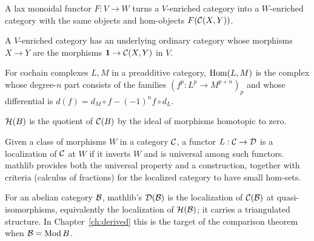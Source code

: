 \begin{theorem}
\label{thm:transport-enrichment}
\mathlibok
\leanok
{}
A lax monoidal functor $F : V \to W$ turns a $V$-enriched category into a $W$-enriched
category with the same objects and hom-objects $F(\mathcal{C}(X,Y))$.
\end{theorem}

\begin{theorem}
\label{thm:forget-enrichment}
\mathlibok
\leanok
{}
A $V$-enriched category has an underlying ordinary category whose morphisms $X \to Y$ are
the morphisms $\mathbf{1} \to \mathcal{C}(X,Y)$ in $V$.
\end{theorem}

\begin{definition}
\label{def:hom-complex}
\mathlibok
\leanok
{}
For cochain complexes $L, M$ in a preadditive category, $\operatorname{Hom}(L,M)$ is the complex whose
degree-$n$ part consists of the families $(f^p : L^p \to M^{p+n})_p$ and whose
differential is $d(f) = d_M \circ f - (-1)^n f \circ d_L$.
\end{definition}

\begin{definition}
\label{def:homotopy-category}
\mathlibok
\leanok
{}
$\mathcal{H}(B)$ is the quotient of $\mathcal{C}(B)$ by the ideal of morphisms homotopic to zero.
\end{definition}

\begin{definition}
\label{def:localization}
\mathlibok
\leanok
Given a class of morphisms $W$ in a category $\mathcal{C}$, a functor $L : \mathcal{C} \to \mathcal{D}$ is a
localization of $\mathcal{C}$ at $W$ if it inverts $W$ and is universal among such functors.
mathlib provides both the universal property and a construction, together with
criteria (calculus of fractions) for the localized category to have small hom-sets.
\end{definition}

\begin{definition}
\label{def:mathlib-derived-category}
\mathlibok
\leanok
{}
For an abelian category $\mathcal{B}$, mathlib's $\mathcal{D}(\mathcal{B})$ is the localization of
$\mathcal{C}(\mathcal{B})$ at quasi-isomorphisms, equivalently the localization of $\mathcal{H}(\mathcal{B})$; it
carries a triangulated structure. In Chapter~\ref{ch:derived} this is the target of the
comparison theorem when $\mathcal{B} = \operatorname{Mod} B$.
\end{definition}
